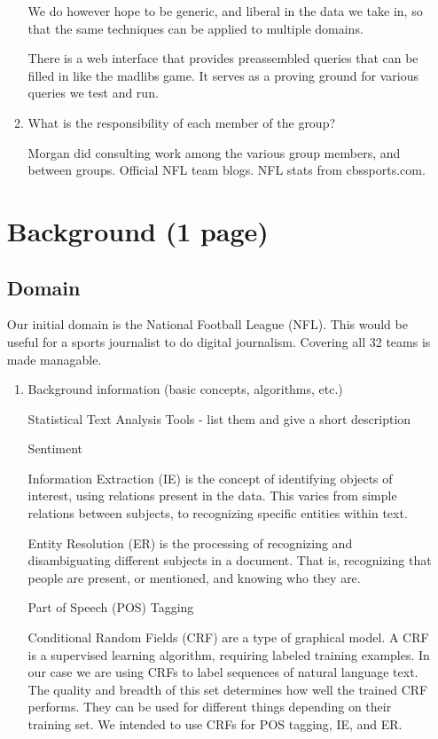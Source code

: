 \documentclass{article}
\begin{document}
\begin{enumerate}
\begin{enumerate}
    We do however hope to be generic, and liberal in the data we take in, so that the same techniques can be applied to multiple domains.

    There is a web interface that provides preassembled queries that can be filled in like the madlibs game.
    It serves as a proving ground for various queries we test and run.

  \item What is the responsibility of each member of the group?



    Morgan did consulting work among the various group members, and between groups.
    Official NFL team blogs. NFL stats from cbssports.com.
  \end{enumerate}

  \section{Background (1 page)}
  \subsection{Domain}

  Our initial domain is the National Football League (NFL).
  This would be useful for a sports journalist to do digital journalism.
  Covering all 32 teams is made managable.

  \begin{enumerate}
  \item Background information (basic concepts, algorithms, etc.)


    Statistical Text Analysis Tools - list them and give a short description

    Sentiment

    Information Extraction (IE) is the concept of identifying objects of interest,
    using relations present in the data.
    This varies from simple relations between subjects,
    to recognizing specific entities within text.

    Entity Resolution (ER) is the processing of recognizing and disambiguating different subjects in a document.
    That is, recognizing that people are present,
    or mentioned, and knowing who they are. 

    Part of Speech (POS) Tagging

    Conditional Random Fields (CRF) are a type of graphical model.
    A CRF is a supervised learning algorithm, requiring labeled training examples.
    In our case we are using CRFs to label sequences of natural language text.
    The quality and breadth of this set determines how well the trained CRF performs.
    They can be used for different things depending on their training set.
    We intended to use CRFs for POS tagging, IE, and ER.


\end{enumerate}
\end{enumerate}
\end{document}
